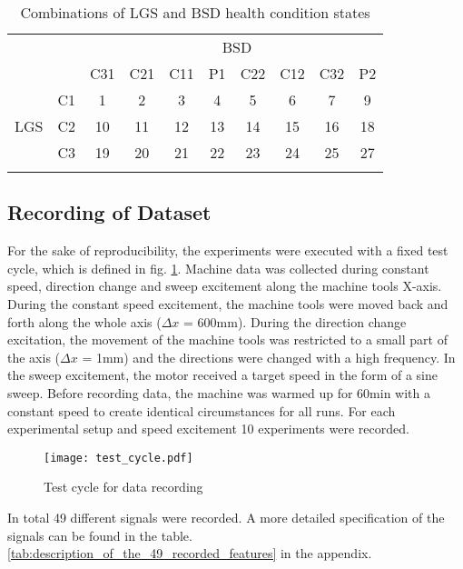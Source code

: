 \begin{center}
\begin{longtable}{c c c c c c c c c c} 
\toprule
  &  &    &     &     &     \multicolumn{2}{c}{BSD}     &     &     &    \\ 
  &  & C31 & C21 & C11 & P1  & C22 & C12 & C32 & P2 \\ 
\midrule
     & \multicolumn{1}{c|}{C1} & 1 & 2 & 3 & 4 & 5 & 6 & 7 & 9 \\ 
 LGS & \multicolumn{1}{c|}{C2}& 10 & 11 & 12 & 13 & 14 & 15 & 16 & 18 \\  
     & \multicolumn{1}{c|}{C3} & 19 & 20 & 21 & 22 & 23 & 24 & 25 & 27 \\ 
\bottomrule
\caption {Combinations of LGS and BSD health condition states}
\label {tab:recorded_combinations_of_LGS_and_BSD_health_conditions}
\end{longtable}
\end{center}


\subsection{Recording of Dataset}
For the sake of reproducibility, the experiments were executed with a fixed test cycle, which is defined in fig. \ref{fig:test_cycle}. Machine data was collected during constant speed, direction change and sweep excitement along the machine tools X-axis. During the constant speed excitement, the machine tools were moved back and forth along the whole axis ($\Delta x$ = 600mm). During the direction change excitation, the movement of the machine tools was restricted to a small part of the axis ($\Delta x$ = 1mm) and the directions were changed with a high frequency. In the sweep excitement, the motor received a target speed in the form of a sine sweep. Before recording data, the machine was warmed up for 60min with a constant speed to create identical circumstances for all runs. For each experimental setup and speed excitement 10 experiments were recorded. 

\begin{figure}[H]
  \centering
  \texttt{[image: test\_cycle.pdf]}
  \caption {Test cycle for data recording}
  \label{fig:test_cycle}
\end{figure}

In total 49 different signals were recorded. A more detailed specification of the signals can be found in the table. \ref{tab:description_of_the_49_recorded_features} in the appendix.

